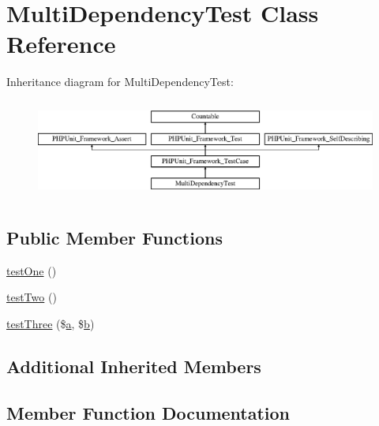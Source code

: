 \hypertarget{class_multi_dependency_test}{}\section{Multi\+Dependency\+Test Class Reference}
\label{class_multi_dependency_test}
Inheritance diagram for Multi\+Dependency\+Test\+:\begin{figure}[H]
\begin{center}
\leavevmode
\includegraphics[height=3.303835cm]{class_multi_dependency_test}
\end{center}
\end{figure}
\subsection*{Public Member Functions}
\begin{DoxyCompactItemize}
\item 
\mbox{\hyperlink{class_multi_dependency_test_afbf3ff88b322c6a7197ce02297cd23a0}{test\+One}} ()
\item 
\mbox{\hyperlink{class_multi_dependency_test_a4fb9974ce113d5d1db8075e0db0dc9b6}{test\+Two}} ()
\item 
\mbox{\hyperlink{class_multi_dependency_test_aab42714bcbe232d78a5de48238d2fd77}{test\+Three}} (\$\mbox{\hyperlink{interfacea}{a}}, \$\mbox{\hyperlink{interfaceb}{b}})
\end{DoxyCompactItemize}
\subsection*{Additional Inherited Members}


\subsection{Member Function Documentation}
\mbox{\label{class_multi_dependency_test_afbf3ff88b322c6a7197ce02297cd23a0}} 
